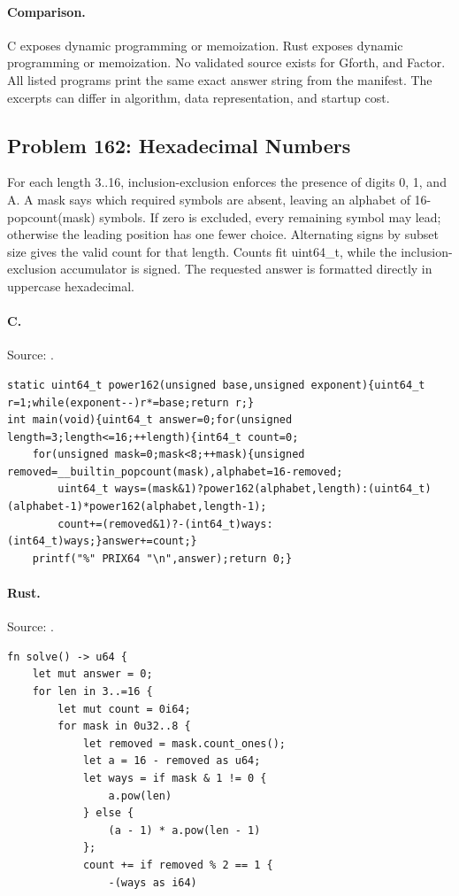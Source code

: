 \paragraph{Comparison.}
C exposes dynamic programming or memoization. Rust exposes dynamic programming or memoization.
No validated source exists for Gforth, and Factor.
All listed programs print the same exact answer string from the manifest. The excerpts can differ in algorithm, data representation, and startup cost.

\subsection{Problem 162: Hexadecimal Numbers}
\label{walkthrough:p162}
For each length 3..16, inclusion-exclusion enforces the presence of digits 0, 1, and A. A mask says which required symbols are absent, leaving an alphabet of 16-popcount(mask) symbols. If zero is excluded, every remaining symbol may lead; otherwise the leading position has one fewer choice. Alternating signs by subset size gives the valid count for that length. Counts fit uint64\_t, while the inclusion-exclusion accumulator is signed. The requested answer is formatted directly in uppercase hexadecimal.

\paragraph{C.} Source: .
\begin{lstlisting}
static uint64_t power162(unsigned base,unsigned exponent){uint64_t r=1;while(exponent--)r*=base;return r;}
int main(void){uint64_t answer=0;for(unsigned length=3;length<=16;++length){int64_t count=0;
    for(unsigned mask=0;mask<8;++mask){unsigned removed=__builtin_popcount(mask),alphabet=16-removed;
        uint64_t ways=(mask&1)?power162(alphabet,length):(uint64_t)(alphabet-1)*power162(alphabet,length-1);
        count+=(removed&1)?-(int64_t)ways:(int64_t)ways;}answer+=count;}
    printf("%" PRIX64 "\n",answer);return 0;}
\end{lstlisting}

\paragraph{Rust.} Source: .
\begin{lstlisting}
fn solve() -> u64 {
    let mut answer = 0;
    for len in 3..=16 {
        let mut count = 0i64;
        for mask in 0u32..8 {
            let removed = mask.count_ones();
            let a = 16 - removed as u64;
            let ways = if mask & 1 != 0 {
                a.pow(len)
            } else {
                (a - 1) * a.pow(len - 1)
            };
            count += if removed % 2 == 1 {
                -(ways as i64)
\end{lstlisting}

